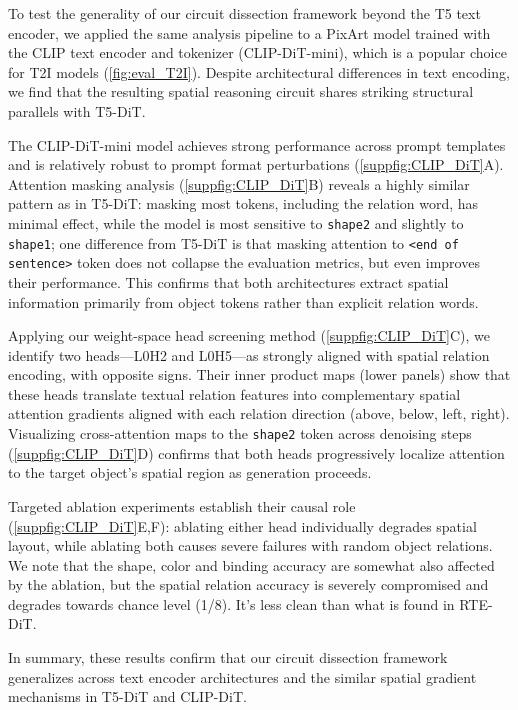   To test the generality of our circuit dissection framework beyond the T5 text encoder, we applied the same analysis pipeline to a PixArt model trained with the CLIP text encoder and tokenizer (CLIP-DiT-mini), which is a popular choice for T2I models (\cref{fig:eval_T2I}). Despite architectural differences in text encoding, we find that the resulting spatial reasoning circuit shares striking structural parallels with T5-DiT. 
  
  The CLIP-DiT-mini model achieves strong performance across prompt templates and is relatively robust to prompt format perturbations (\cref{suppfig:CLIP_DiT}A). Attention masking analysis (\cref{suppfig:CLIP_DiT}B) reveals a highly similar pattern as in T5-DiT: masking most tokens, including the relation word, has minimal effect, while the model is most sensitive to \texttt{shape2} and slightly to \texttt{shape1}; 
  one difference from T5-DiT is that masking attention to \texttt{<end of sentence>} token does not collapse the evaluation metrics, but even improves their performance. 
  This confirms that both architectures extract spatial information primarily from object tokens rather than explicit relation words.
  
  Applying our weight-space head screening method (\cref{suppfig:CLIP_DiT}C), we identify two heads---L0H2 and L0H5---as strongly aligned with spatial relation encoding, with opposite signs. Their inner product maps (lower panels) show that these heads translate textual relation features into complementary spatial attention gradients aligned with each relation direction (above, below, left, right). Visualizing cross-attention maps to the \texttt{shape2} token across denoising steps (\cref{suppfig:CLIP_DiT}D) confirms that both heads progressively localize attention to the target object's spatial region as generation proceeds.
  
  Targeted ablation experiments establish their causal role (\cref{suppfig:CLIP_DiT}E,F): ablating either head individually degrades spatial layout, while ablating both causes severe failures with random object relations. We note that the shape, color and binding accuracy are somewhat also affected by the ablation, but the spatial relation accuracy is severely compromised and degrades towards chance level (1/8). It's less clean than what is found in RTE-DiT.
  
  In summary, these results confirm that our circuit dissection framework generalizes across text encoder architectures and the similar spatial gradient mechanisms in T5-DiT and CLIP-DiT.
  
